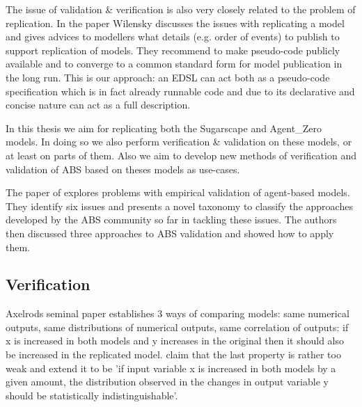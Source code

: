 The issue of validation \& verification is also very closely related to the problem of replication. In the paper \cite{wilensky_making_2007} Wilensky discusses the issues with replicating a model and gives advices to modellers what details (e.g. order of events) to publish to support replication of models. They recommend to make pseudo-code publicly available and to converge to a common standard form for model publication in the long run. This is our approach: an EDSL can act both as a pseudo-code specification which is in fact already runnable code and due to its declarative and concise nature can act as a full description.
  
In this thesis we aim for replicating both the Sugarscape \cite{epstein_growing_1996} and Agent\_Zero \cite{epstein_agent_zero:_2014} models. In doing so we also perform verification \& validation on these models, or at least on parts of them. Also we aim to develop new methods of verification and validation of ABS based on theses models as use-cases. 

The paper of \cite{windrum_empirical_2007} explores problems with empirical validation of agent-based models. They identify six issues and presents a novel taxonomy to classify the approaches developed by the ABS community so far in tackling these issues. The authors then discussed three approaches to ABS validation and showed how to apply them.

\subsection{Verification}
Axelrods seminal paper \cite{axelrod_advancing_1997} establishes 3 ways of comparing models: same numerical outputs, same distributions of numerical outputs, same correlation of outputs: if x is increased in both models and y increases in the original then it should also be increased in the replicated model. \cite{ormerod_epistemological_2009} claim that the last property is rather too weak and extend it to be 'if input variable x is increased in both models by a given amount, the distribution observed in the changes in output variable y should be statistically indistinguishable'.

